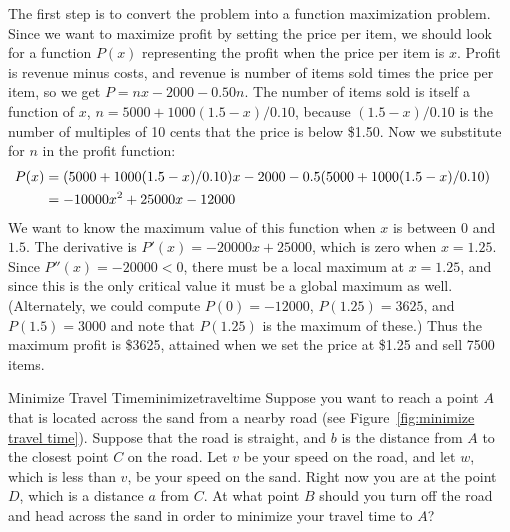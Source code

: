 \begin{solution} 
The first step is to convert the problem into a function maximization
problem. Since we want to maximize profit by setting the price per
item, we should look for a function $P(x)$ representing the profit
when the price per item is $x$. Profit is revenue minus costs, and
revenue is number of items sold times the price per item, so we get
$P=nx-2000-0.50n$. The number of items sold is itself a function of
$x$, $n=5000+1000(1.5-x)/0.10$, because $ (1.5-x)/0.10$ is the number
of multiples of 10 cents that the price is below \$1.50.
Now we substitute for $n$ in the profit function:
\begin{eqnarray*}
  P(x)&=(5000+1000(1.5-x)/0.10)x-2000- 0.5(5000+1000(1.5-x)/0.10)\cr
&=-10000x^2+25000x-12000\cr
\end{eqnarray*} 
We want to know the maximum value of this function when $x$ is
between 0 and $1.5$. The derivative is $P'(x)=-20000x+25000$, which
is zero when $x=1.25$. Since $P''(x)=-20000<0$, there must be a local
maximum at $x=1.25$, and since this is the only critical value it must
be a global maximum as well. (Alternately, we could compute
$P(0)=-12000$, $P(1.25)=3625$, and $P(1.5)=3000$ and note that
$P(1.25)$ is the maximum of these.) Thus the maximum profit is \$3625,
attained when we set the price at \$1.25 and sell 7500 items.
\end{solution}

\begin{example}{Minimize Travel Time}{minimizetraveltime}
 Suppose you want to reach a point $A$ that is located across the
sand from a nearby road (see Figure~\ref{fig:minimize travel time}).
Suppose that the road is straight, and $b$ is the distance from $A$ to
the closest point $C$ on the road.  Let $v$ be your speed on the road,
and let $w$, which is less than $v$, be your speed on the sand.  Right
now you are at the point $D$, which is a distance $a$ from $C$.  At
what point $B$ should you turn off the road and head across the sand
in order to minimize your travel time to $A$?
\end{example}

